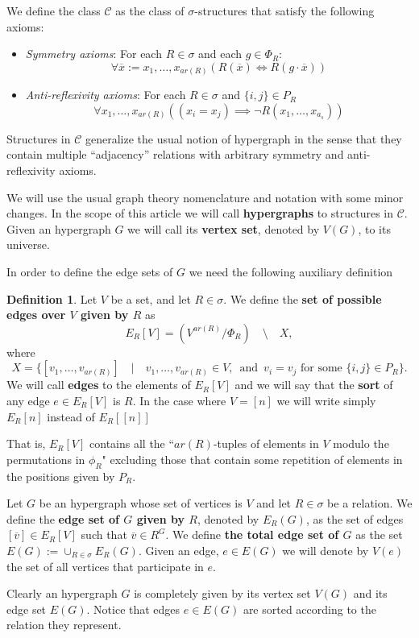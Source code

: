 \documentclass[12pt,notitlepage,a4paper]{article}
\theoremstyle{definition}
\newtheorem{definition}{Definition}[section]
\begin{document}
We define the class $\mathcal{C}$ as the 
class of $\sigma$-structures that
satisfy the 
following axioms: 
\begin{itemize}
	\item \textit{Symmetry axioms}: For each $R\in \sigma$ and
	each $g\in \Phi_R$:
	\[ \forall \overline{x}:=x_1,\dots, x_{ar(R)} \left(  R(\overline{x})
	\iff R(g\cdot\overline{x}) \right)    \]
	\item \textit{Anti-reflexivity axioms}: For each 
	$R\in \sigma$ and $\{i,j\}\in P_R$
	\[ \forall x_1,\dots, x_{ar(R)} 
	\left( (x_i=x_j) \implies \neg R(x_1,\dots, x_{a_s})
	\right)\]
\end{itemize}

Structures in $\mathcal{C}$ generalize the usual notion of hypergraph
in the sense that they contain multiple ``adjacency'' relations with arbitrary 
symmetry and anti-reflexivity axioms. \par
We will use the usual graph theory nomenclature and notation with some minor changes. 
In the scope of this article we will call \textbf{hypergraphs}
to structures in $\mathcal{C}$.
Given an hypergraph $G$ we will call its \textbf{vertex set}, denoted by $V(G)$,
to its universe.\par
In order to define the edge sets of $G$ we need the following auxiliary definition
\begin{definition} 
	Let $V$ be a set, and let $R\in \sigma$.
	We define the \textbf{set of possible edges over $V$
	given by $R$} as
	\[ E_R[V]= (V^{ar(R)}/\Phi_R) \quad \setminus 
	\quad X, \]
	where
	\[
	X=
	\Big\{ [v_1,\dots,v_{ar(R)}]  
	\quad \Big| \quad
	v_1,\dots,v_{ar(R)}\in V, \,
	\text{ and } 
	 \, v_i=v_j \text{ for some } 
	\{i,j\}\in P_R \Big\}.
	\]
	We will call \textbf{edges} to the elements of
	$E_R[V]$ and we will say that the \textbf{sort} of any edge $e\in E_R[V]$
	is $R$.	In the case where $V=[n]$ we will write simply $E_R[n]$ instead
	of $E_R[[n]]$
\end{definition}

That is, $E_R[V]$ contains all the ``$ar(R)$-tuples of elements
in $V$ modulo the permutations
in $\phi_R$" 
excluding those that contain some repetition of elements in
the positions given by $P_R$.\par
Let $G$ be an hypergraph whose set of vertices is $V$ and let $R\in \sigma$
be a relation. 
We define the \textbf{edge set of $G$ given by $R$}, denoted by $E_R(G)$, 
as the set of edges $[\overline{v}]\in E_R[V]$ such that $\overline{v}\in R^G$. 
We define \textbf{the total edge set of $G$} as the set $E(G):=\cup_{R\in \sigma} E_R(G)$.
Given an edge, $e\in E(G)$ we will denote by $V(e)$
the set of all vertices that participate in $e$. 
\par
Clearly an hypergraph $G$ is completely given by its vertex set $V(G)$ and its edge 
set $ E(G)$. Notice that edges $e\in E(G)$ are sorted according to the relation they represent.
\par
\end{document}

